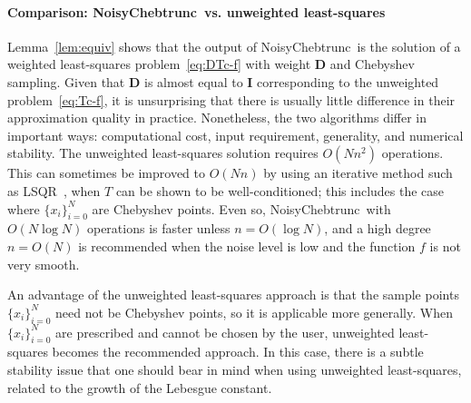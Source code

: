 \documentclass[final,onefignum,onetabnum]{siamart220329}
\def\mainalg{NoisyChebtrunc}
\newcommand{\mtx}[1]{\bm{#1}}
\begin{document}





\paragraph{Comparison: \mainalg\ vs. unweighted least-squares}
Lemma~\ref{lem:equiv} shows that the output of 
\mainalg\ is the solution of a weighted least-squares problem~\eqref{eq:DTc-f} with weight $\mtx{D}$ and Chebyshev sampling. 
{Given that $\mtx{D}$ is almost equal to $\mtx{I}$ corresponding to the unweighted problem~\eqref{eq:Tc-f}, it} is unsurprising that there is usually little difference in their approximation quality in practice. 
Nonetheless, the two algorithms differ in important ways: computational cost, input requirement, generality, and numerical stability. 
The unweighted least-squares solution requires $O(Nn^2)$ operations. 
This can sometimes be improved to $O(Nn)$ by using an iterative method such as LSQR~\cite{paige1982lsqr}, when $T$ can be shown to be well-conditioned; this includes the case where $\{x_i\}_{i=0}^N$ are Chebyshev points. Even so, \mainalg\  with $O(N\log N)$ operations is faster unless $n=O(\log N)${, and a high degree $n=O(N)$ is recommended when the noise level is low and the function $f$ is not very smooth}.  

An advantage of the unweighted least-squares approach is that 
the sample points $\{x_i\}_{i=0}^N$ need not be Chebyshev points, so it is applicable more generally. When $\{x_i\}_{i=0}^N$ are prescribed and cannot be chosen by the user, unweighted least-squares becomes the recommended approach. In this case, there is a subtle stability issue that one should bear in mind when using unweighted least-squares, related to the growth of the Lebesgue constant. 
\end{document}
